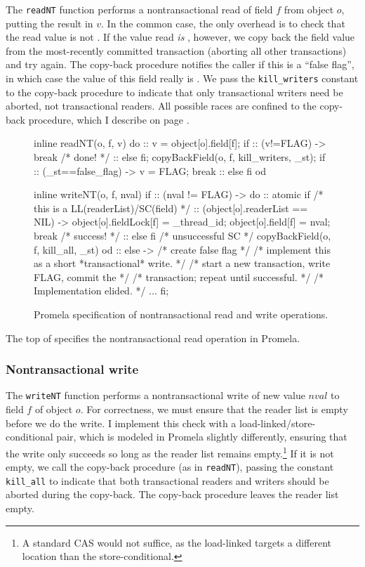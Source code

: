 The {\tt readNT} function performs a nontransactional read of field $f$ from
object $o$, putting the result in $v$.  
In the common case, the only overhead is to check that
the read value is not \FLAG\@.  If the value read \emph{is}
\FLAG, however, we copy back the field value 
from the most-recently committed transaction (aborting all other
transactions) and try again.  The copy-back procedure notifies
the caller if this is a ``false flag'', in which case the value of this
field really is \FLAG\@.  We pass the {\tt kill\_writers} constant
to the copy-back procedure to
indicate that only transactional writers need be aborted, not
transactional readers.
All possible races are confined to the copy-back procedure, which I
describe on page \pageref{sec:copyback}.

\begin{figure}
\begin{inlinecode}
inline readNT(o, f, v) {
  do
  :: v = object[o].field[f];
     if
     :: (v!=FLAG) -> break /* done! */
     :: else
     fi;
     copyBackField(o, f, kill_writers, _st);
     if
     :: (_st==false_flag) ->
        v = FLAG;
        break
     :: else
     fi
  od
}

inline writeNT(o, f, nval) {
  if
  :: (nval != FLAG) ->
     do
     :: atomic {
          if /* this is a LL(readerList)/SC(field) */
          :: (object[o].readerList == NIL) ->
             object[o].fieldLock[f] = _thread_id;
             object[o].field[f] = nval;
             break /* success! */
          :: else
          fi
        }
        /* unsuccessful SC */
        copyBackField(o, f, kill_all, _st)
     od
  :: else -> /* create false flag */
     /* implement this as a short *transactional* write. */
     /* start a new transaction, write FLAG, commit the */
     /* transaction; repeat until successful. */
     /* Implementation elided. */
     ...
  fi;
}
\end{inlinecode}
\caption{Promela specification of nontransactional read and write operations.}
\label{fig:promrwnt}
\end{figure}
The top of  specifies the nontransactional read operation in
Promela.

\subsubsection{Nontransactional write}
The {\tt writeNT} function performs a nontransactional write of new value $nval$
to field $f$ of object $o$.  For correctness, we must ensure that
the reader list is empty before we do the write.  I implement this check
with a load-linked/store-conditional pair, which is modeled in
Promela slightly differently, ensuring that the write only succeeds
so long as the reader list remains empty.\footnote{A
  standard CAS would not suffice, as the load-linked targets a
  different location than the store-conditional.}
If it is not empty, we
call the copy-back procedure (as in {\tt readNT}), passing the
constant {\tt kill\_all} to indicate that both transactional readers
and writers should be aborted during the copy-back.  The copy-back
procedure leaves the reader list empty.

